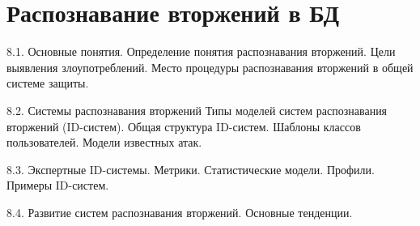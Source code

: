 \section{Распознавание вторжений в БД}
8.1. Основные понятия.
Определение понятия распознавания вторжений. Цели выявления злоупотреблений. Место процедуры распознавания вторжений в общей системе защиты. 

8.2. Системы распознавания вторжений
Типы моделей систем распознавания вторжений (ID-систем). Общая структура ID-систем. Шаблоны классов пользователей. Модели известных атак. 

8.3. Экспертные ID-системы.
Метрики. Статистические модели. Профили. Примеры ID-систем. 

8.4. Развитие систем распознавания вторжений.
Основные тенденции.